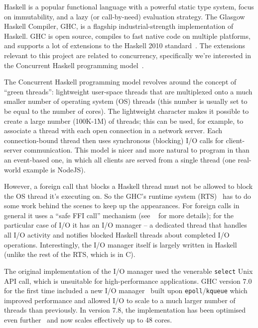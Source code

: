 \documentclass[10pt, oneside]{article}
\begin{document}
Haskell is a popular functional language with a powerful static type system,
focus on immutability, and a lazy (or call-by-need) evaluation strategy. The
Glasgow Haskell Compiler, GHC, is a flagship industrial-strength implementation
of Haskell. GHC is open source, compiles to fast native code on multiple
platforms, and supports a lot of extensions to the Haskell 2010
standard~\cite{bib:haskell-2010}. The extensions relevant to this project are
related to concurrency, specifically we're interested in the Concurrent Haskell
programming model~\cite{bib:marlow}.

The Concurrent Haskell programming model revolves around the concept of ``green
threads'': lightweight user-space threads that are multiplexed onto a much
smaller number of operating system (OS) threads (this number is usually set to
be equal to the number of cores). The lightweight character makes it possible to
create a large number (100K-1M) of threads; this can be used, for example, to
associate a thread with each open connection in a network server. Each
connection-bound thread then uses synchronous (blocking) I/O calls for
client-server communication. This model is nicer and more natural to program in
than an event-based one, in which all clients are served from a single thread
(one real-world example is NodeJS).

However, a foreign call that blocks a Haskell thread must not be allowed to
block the OS thread it's executing on. So the GHC's runtime system
(RTS)~\cite{bib:ghc-rts-multicore} has to do some work behind the scenes to keep
up the appearances. For foreign calls in general it uses a ``safe FFI call''
mechanism (see ~\cite{bib:ffi-conc} for more details); for the particular case
of I/O it has an I/O manager -- a dedicated thread that handles all I/O activity
and notifies blocked Haskell threads about completed I/O
operations. Interestingly, the I/O manager itself is largely written in Haskell
(unlike the rest of the RTS, which is in C).

The original implementation of the I/O manager used the venerable
\texttt{select} Unix API call, which is unsuitable for high-performance
applications. GHC version 7.0 for the first time included a new I/O
manager~\cite{bib:tibell} built upon \texttt{epoll}/\texttt{kqueue} which
improved performance and allowed I/O to scale to a much larger number of threads
than previously. In version 7.8, the implementation has been optimised even
further~\cite{bib:mio} and now scales effectively up to 48 cores.
\end{document}
